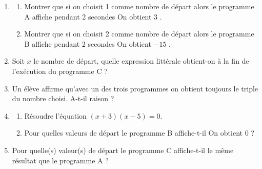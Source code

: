 \documentclass[exercice,a4]{thedocument}%
\begin{document}
\begin{enumerate}
	\item \begin{enumerate}
		\item Montrer que si on choisit 1 comme nombre de départ alors le programme A affiche pendant 2 secondes \og On obtient 3 \fg.

		\item Montrer que si on choisit 2 comme nombre de départ alors le programme B affiche pendant 2 secondes \og On obtient $-15$ \fg.
	\end{enumerate}

	\item Soit $x$ le nombre de départ, quelle expression littérale obtient-on à la fin de l'exécution du programme C ?

	\item Un élève affirme qu'avec un des trois programmes on obtient toujours le triple du nombre choisi. A-t-il raison ?

	\item \begin{enumerate}
		\item Résoudre l'équation $(x + 3)(x - 5) = 0$.

		\item Pour quelles valeurs de départ le programme B affiche-t-il \og On obtient 0 \fg{} ?
	\end{enumerate}

	\item Pour quelle(s) valeur(s) de départ le programme C affiche-t-il le même résultat que le programme A ?
\end{enumerate}
\vspace{0,5cm}

\showthesource
\end{document}
